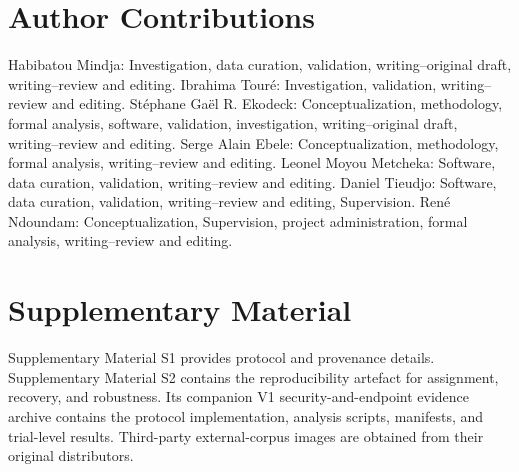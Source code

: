 \documentclass[preprint,12pt]{elsarticle}
\theoremstyle{plain}
\providecommand{\DIFaddtex}[1]{{\protect\color{blue} \sf #1}} %
\providecommand{\DIFadd}[1]{\texorpdfstring{\DIFaddtex{#1}}{#1}} %
\begin{document}
\section*{Author Contributions}
Habibatou Mindja: Investigation, data curation, validation, writing--original draft, writing--review and editing. Ibrahima Tour\'e: Investigation, validation, writing--review and editing. St\'ephane Ga\"el R. Ekodeck: Conceptualization, methodology, formal analysis, software, validation, investigation, writing--original draft, writing--review and editing. Serge Alain Ebele: Conceptualization, methodology, formal analysis, writing--review and editing. Leonel Moyou Metcheka: Software, data curation, validation, writing--review and editing. Daniel Tieudjo: Software, data curation, validation, writing--review and editing, Supervision. Ren\'e Ndoundam: Conceptualization, Supervision, project administration, formal analysis, writing--review and editing.
\section*{Supplementary Material}
\DIFadd{Supplementary Material S1 provides protocol and provenance details. Supplementary Material S2 contains the reproducibility artefact for assignment, recovery, and robustness. Its companion V1 security-and-endpoint evidence archive contains the protocol implementation, analysis scripts, manifests, and trial-level results. Third-party external-corpus images are obtained from their original distributors.}
\end{document}
